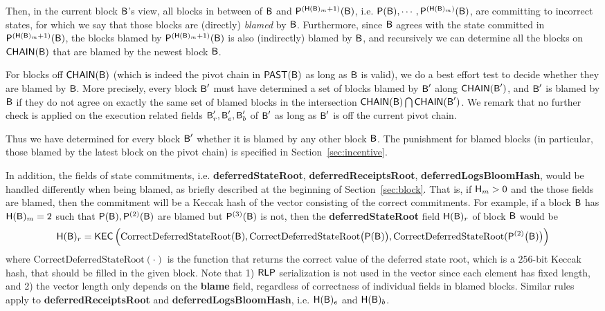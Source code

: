 	Then, in the current block $\textsf{B}$'s view, all blocks in between of $\textsf{B}$ and $\mathsf{P}^{\left(\textsf{H}(\textsf{B})_{m}+1\right)}(\textsf{B})$, i.e. $\mathsf{P}(\textsf{B}), \cdots, \mathsf{P}^{\left(\textsf{H}(\textsf{B})_{m}\right)}(\textsf{B})$, are committing to incorrect states, for which we say that those blocks are (directly) \emph{blamed} by $\textsf{B}$.
	Furthermore, since $\textsf{B}$ agrees with the state committed in $\mathsf{P}^{\left(\textsf{H}(\textsf{B})_{m}+1\right)}(\textsf{B})$,
	the blocks blamed by $\mathsf{P}^{\left(\textsf{H}(\textsf{B})_{m}+1\right)}(\textsf{B})$ is also (indirectly) blamed by $\textsf{B}$, and recursively we can determine all the blocks on $\mathsf{CHAIN}(\textsf{B})$ that are blamed by the newest block $\textsf{B}$.

	For blocks off $\mathsf{CHAIN}(\textsf{B})$ (which is indeed the pivot chain in $\mathsf{PAST}(\textsf{B})$ as long as $\textsf{B}$ is valid), 
	we do a best effort test to decide whether they are blamed by $\textsf{B}$.
	More precisely,
	every block $\textsf{B}'$ must have determined a set of blocks blamed by $\textsf{B}'$ along $\mathsf{CHAIN}(\textsf{B}')$,
	and $\textsf{B}'$ is blamed by $\textsf{B}$ if they do not agree on exactly the same set of blamed blocks in the intersection $\mathsf{CHAIN}(\textsf{B})\bigcap\mathsf{CHAIN}(\textsf{B}')$.
	We remark that no further check is applied on the execution related fields $\textsf{B}'_r,\textsf{B}'_e,\textsf{B}'_b$ of $\textsf{B}'$ as long as $\textsf{B}'$ is off the current pivot chain.

	Thus we have determined for every block $\textsf{B}'$ whether it is blamed by any other block $\textsf{B}$.
	The punishment for blamed blocks (in particular, those blamed by the latest block on the pivot chain) is specified in Section~\ref{sec:incentive}.

	In addition, the fields of state commitments, i.e. {\bf deferredStateRoot}, {\bf deferredReceiptsRoot}, {\bf deferredLogsBloomHash}, 
	would be handled differently when being blamed, as briefly described at the beginning of Section~\ref{sec:block}.
	That is, if $\textsf{H}_m>0$ and the those fields are blamed, 
	then the commitment will be a Keccak hash of the vector consisting of the correct commitments.
	For example, if a block $\textsf{B}$ has $\textsf{H}(\textsf{B})_m=2$ such that $\mathsf{P}(\textsf{B}),\mathsf{P}^{(2)}(\textsf{B})$ are blamed but $\mathsf{P}^{(3)}(\textsf{B})$ is not, then the {\bf deferredStateRoot} field 
	$\textsf{H}(\textsf{B})_r$ of block $\textsf{B}$
	would be 
	\begin{align}
		\textsf{H}(\textsf{B})_r = \mathsf{KEC}\left( \mathrm{CorrectDeferredStateRoot}(\textsf{B}), \mathrm{CorrectDeferredStateRoot}\big(\mathsf{P}(\textsf{B})\big), \mathrm{CorrectDeferredStateRoot}(\mathsf{P}^{(2)}\big(\textsf{B})\big) \right)
	\end{align}
	where $\mathrm{CorrectDeferredStateRoot}(\cdot)$ is the function that returns the correct value of the deferred state root, 
	which is a $256$-bit Keccak hash, that should be filled in the given block.
	Note that 1) $\mathsf{RLP}$ serialization is not used in the vector since each element has fixed length,
	and 2) the vector length only depends on the {\bf blame} field, regardless of correctness of individual fields in  blamed blocks.
	Similar rules apply to  {\bf deferredReceiptsRoot} and {\bf deferredLogsBloomHash}, i.e. $\textsf{H}(\textsf{B})_e$ and $\textsf{H}(\textsf{B})_b$.


